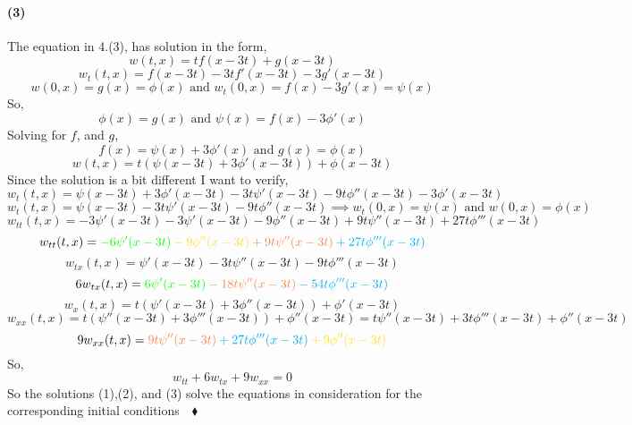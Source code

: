 \documentclass{article}
\begin{document}
\paragraph{(3)} The equation in 4.(3), has solution in the form,
\[w(t,x) = tf(x-3t)+g(x-3t)\]
\[w_t(t,x) = f(x-3t)-3tf'(x-3t)-3g'(x-3t)\]
\[w(0,x) = g(x) = \phi(x) \text{ and } w_t(0,x) = f(x)-3g'(x) = \psi(x)\]
So,
\[\phi(x) = g(x) \text{ and } \psi(x) = f(x) -3\phi'(x)\]
Solving for $f$, and $g$,
\[f(x) = \psi(x) +3\phi'(x)\text{ and } g(x) = \phi(x)\]
\[w(t,x) = t\left(\psi(x-3t) +3\phi'(x-3t)\right) + \phi(x-3t)\]
\newpage
Since the solution is a bit different I want to verify,
\[w_t(t,x) = \psi(x-3t) +3\phi'(x-3t) -3t\psi'(x-3t) -9t\phi''(x-3t)  -3\phi'(x-3t)\]
\[w_t(t,x)= \psi(x-3t) -3t\psi'(x-3t) -9t\phi''(x-3t) \implies w_t(0,x) = \psi(x) \text{ and } w(0,x) =\phi(x)\]
\[w_{tt}(t,x) =-3\psi'(x-3t)-3\psi'(x-3t)-9\phi''(x-3t)+9t\psi''(x-3t) +27t\phi'''(x-3t)\]
\[w_{tt}(t,x) =
  \color{green}-6\psi'(x-3t)
  \color{Goldenrod}-9\phi''(x-3t)
  \color{Peach}+9t\psi''(x-3t) \color{cyan}+27t\phi'''(x-3t)\]
\[w_{tx}(t,x) = \psi'(x-3t) -3t\psi''(x-3t) -9t\phi'''(x-3t)\]
\[6w_{tx}(t,x) = \color{green}6\psi'(x-3t)
  \color{Peach}-18t\psi''(x-3t) \color{cyan}-54t\phi'''(x-3t)\]
\[w_x(t,x) = t\left(\psi'(x-3t) +3\phi''(x-3t)\right) + \phi'(x-3t)\]
\[w_{xx}(t,x) = t\left(\psi''(x-3t) +3\phi'''(x-3t)\right) +
  \phi''(x-3t) = t\psi''(x-3t) +3t\phi'''(x-3t) +\phi''(x-3t)\]
\[9w_{xx}(t,x) = \color{Peach}9t\psi''(x-3t) \color{cyan}+27t\phi'''(x-3t) \color{Goldenrod}+9\phi''(x-3t)\]
So,
\[w_{tt} +6w_{tx}+9w_{xx} = 0\]
So the solutions (1),(2), and (3) solve the equations in
consideration for the corresponding initial conditions$\quad \blacklozenge$
\end{document}
